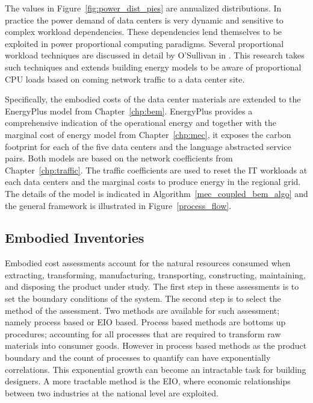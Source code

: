     
    
    The values in Figure~\ref{fig:power_dist_pies} are annualized distributions. In practice the power demand of data centers is very dynamic and sensitive to complex workload dependencies. These dependencies lend themselves to be exploited in power proportional computing paradigms. Several proportional workload techniques are discussed in detail by O'Sullivan in \cite{osullivan15}. This research takes such techniques and extends building energy models to be aware of proportional CPU loads based on coming network traffic to a data center site.
    
    Specifically, the embodied costs of the data center materials are extended to the EnergyPlus model from Chapter~\ref{chp:bem}. EnergyPlus provides a comprehensive indication of the operational energy and together with the marginal cost of energy model from Chapter~\ref{chp:mec}, it exposes the carbon footprint for each of the five data centers and the language abstracted service pairs. Both models are based on the network coefficients  from Chapter~\ref{chp:traffic}. The traffic coefficients are used to reset the IT workloads at each data centers and the marginal costs to produce energy in the regional grid. The details of the model is indicated in Algorithm~\ref{mec_coupled_bem_algo} and the general framework is illustrated in Figure~\ref{process_flow}.
    
    
    
    
    
    \subsection{Embodied Inventories}
    Embodied cost assessments account for the natural resources consumed when extracting, transforming, manufacturing, transporting, constructing, maintaining, and disposing the product under study. The first step in these assessments is to set the boundary conditions of the system. The second step is to select the method of the assessment. Two methods are available for such assessment; namely process based or EIO based. Process based methods are bottoms up procedures; accounting for all processes that are required to transform raw materials into consumer goods. However in process based methods as the product boundary and the count of processes to quantify can have exponentially correlations. This exponential growth can become an intractable task for building designers. A more tractable method is the EIO, where economic relationships between two industries at the national level are exploited. 
    
